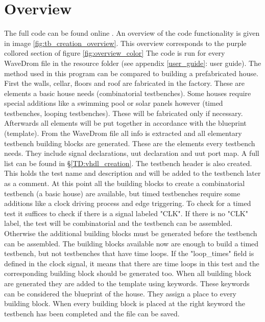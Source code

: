 \section{Overview}
The full code can be found online \cite{github}. An overview of the code functionality is given in image \ref{fig:tb_creation_overview}. This overview corresponds to the purple collored section of figure \ref{fig:overview_color}%
\clearpage\noindent
The code is run for every WaveDrom file in the resource folder (see appendix \ref{user_guide}: user guide). The method used in this program can be compared to building a prefabricated house. First the walls, cellar, floors and roof are fabricated in the factory. These are elements a basic house needs (combinatorial testbenches). Some houses require special additions like a swimming pool or solar panels however (timed testbenches, looping testbenches). These will be fabricated only if necessary. Afterwards all elements will be put together in accordance with the blueprint (template).
\npar
From the WaveDrom file all info is extracted and all elementary testbench building blocks are generated. These are the elements every testbench needs. They include signal declarations, uut declaration and uut port map. A full list can be found in §\ref{TD:vhdl_creation}. The testbench header is also created. This holds the test name and description and will be added to the testbench later as a comment.
\npar
At this point all the building blocks to create a combinatorial testbench (a basic house) are available, but timed testbenches require some additions like a clock driving process and edge triggering. To check for a timed test it suffices to check if there is a signal labeled "CLK". If there is no "CLK" label, the test will be combinatorial and the testbench can be assembled. Otherwise the additional building blocks must be generated before the testbench can be assembled. 
\npar
The building blocks available now are enough to build a timed testbench, but not testbenches that have time loops. If the "loop\_times" field is defined in the clock signal, it means that there are time loops in this test and the corresponding building block should be generated too.
\npar
When all building block are generated they are added to the template using keywords. These keywords can be considered the blueprint of the house. They assign a place to every building block. When every building block is placed at the right keyword the testbench has been completed and the file can be saved.\newpage
